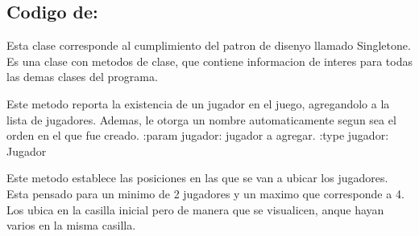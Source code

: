 \documentclass[letterpaper,10pt,english]{sphinxmanual}
\begin{document}
\subsection{Codigo de: }
\label{\detokenize{codigo:module-singleton}}\label{\detokenize{codigo:codigo-de-singleton}}

\begin{fulllineitems}
\label{\detokenize{codigo:singleton.Singleton}}
Esta clase corresponde al cumplimiento del patron de disenyo 
llamado Singletone. Es una clase con metodos de clase, que contiene
informacion de interes para todas las demas clases del programa.

\begin{fulllineitems}
\label{\detokenize{codigo:singleton.Singleton.agregar_jugador}}
Este metodo reporta la existencia de un jugador en el juego, agregandolo a la lista de jugadores. 
Ademas, le otorga un nombre automaticamente segun sea el orden en el que fue creado.
:param jugador: jugador a agregar.
:type jugador: Jugador

\end{fulllineitems}


\begin{fulllineitems}
\label{\detokenize{codigo:singleton.Singleton.establecer_pos_jugadores}}
Este metodo establece las posiciones en las que se van a ubicar los jugadores. Esta pensado
para un minimo de 2 jugadores y un maximo que corresponde a 4. Los ubica en la casilla inicial pero
de manera que se visualicen, anque hayan varios en la misma casilla.

\end{fulllineitems}


\end{fulllineitems}
\end{document}
